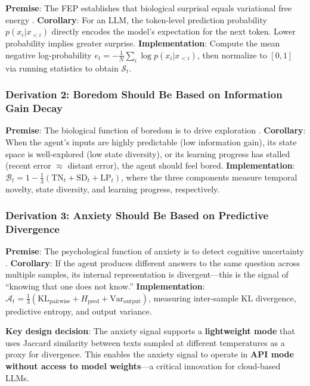 \documentclass[pdflatex,sn-mathphys-num]{sn-jnl}
\newcommand{\surprise}{\mathcal{S}}
\newcommand{\boredom}{\mathcal{B}}
\newcommand{\anxiety}{\mathcal{A}}
\theoremstyle{thmstyleone}%
\theoremstyle{thmstyletwo}%
\theoremstyle{thmstylethree}%
\begin{document}
\textbf{Premise}: The FEP establishes that biological surprisal equals variational free energy \cite{friston2022active}. \textbf{Corollary}: For an LLM, the token-level prediction probability $p(x_i|x_{<i})$ directly encodes the model's expectation for the next token. Lower probability implies greater surprise. \textbf{Implementation}: Compute the mean negative log-probability $e_t = -\frac{1}{N}\sum_{i}\log p(x_i|x_{<i})$, then normalize to $[0,1]$ via running statistics to obtain $\surprise_t$.

\subsubsection{Derivation 2: Boredom Should Be Based on Information Gain Decay}

\textbf{Premise}: The biological function of boredom is to drive exploration \cite{colas2022autotelic}. \textbf{Corollary}: When the agent's inputs are highly predictable (low information gain), its state space is well-explored (low state diversity), or its learning progress has stalled (recent error $\approx$ distant error), the agent should feel bored. \textbf{Implementation}: $\boredom_t = 1 - \frac{1}{3}(\text{TN}_t + \text{SD}_t + \text{LP}_t)$, where the three components measure temporal novelty, state diversity, and learning progress, respectively.

\subsubsection{Derivation 3: Anxiety Should Be Based on Predictive Divergence}

\textbf{Premise}: The psychological function of anxiety is to detect cognitive uncertainty \cite{kawato2023metacognitive}. \textbf{Corollary}: If the agent produces different answers to the same question across multiple samples, its internal representation is divergent---this is the signal of ``knowing that one does not know.'' \textbf{Implementation}: $\anxiety_t = \frac{1}{3}(\text{KL}_{\text{pairwise}} + H_{\text{pred}} + \text{Var}_{\text{output}})$, measuring inter-sample KL divergence, predictive entropy, and output variance.

\textbf{Key design decision}: The anxiety signal supports a \textbf{lightweight mode} that uses Jaccard similarity between texts sampled at different temperatures as a proxy for divergence. This enables the anxiety signal to operate in \textbf{API mode without access to model weights}---a critical innovation for cloud-based LLMs.
\end{document}
